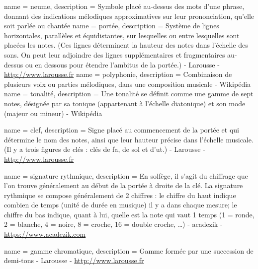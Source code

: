 {
        name = neume,
        description = {Symbole placé au-dessus des mots d'une phrase, donnant des indications mélodiques approximatives sur leur prononciation, qu'elle soit parlée ou chantée}        
}
{
	name = {port{é}e},
	description = {Système de lignes horizontales, parallèles et équidistantes, sur lesquelles ou entre lesquelles sont placées les notes. (Ces lignes déterminent la hauteur des notes dans l'échelle des sons. On peut leur adjoindre des lignes supplémentaires et fragmentaires au-dessus ou en dessous pour étendre l'ambitus de la portée.) - Larousse - \url{http://www.larousse.fr}}	
}
{
	name = {polyphonie},
	description = {Combinaison de plusieurs voix ou parties mélodiques, dans une composition musicale - Wikipédia}	
}
{
	name = {tonalit{é}},
	description = {Une tonalité se définit comme une gamme de sept notes, désignée par sa tonique (appartenant à l'échelle diatonique) et son mode (majeur ou mineur) - Wikipédia}
}

{
	name = {clef},
	description = {Signe placé au commencement de la portée et qui détermine le nom des notes, ainsi que leur hauteur précise dans l'échelle musicale. (Il y a trois figures de clés : clés de fa, de sol et d'ut.) - Larousse - \url{http://www.larousse.fr}}
}

{
	name = {signature rythmique},
	description = {En solfège, il s’agit du chiffrage que l’on trouve généralement au début de la portée à droite de la clé. La signature rythmique se compose généralement de 2 chiffres :
le chiffre du haut indique combien de temps (unité de durée en musique) il y a dans chaque mesure; 
le chiffre du bas indique, quant à lui, quelle est la note qui vaut 1 temps (1 = ronde, 2 = blanche, 4 = noire, 8 = croche, 16 = double croche, …) - acadezik - \url{https://www.acadezik.com}}
}

{
	name = {gamme chromatique},
	description = {Gamme formée par une succession de demi-tons - Larousse - \url{http://www.larousse.fr}}
}